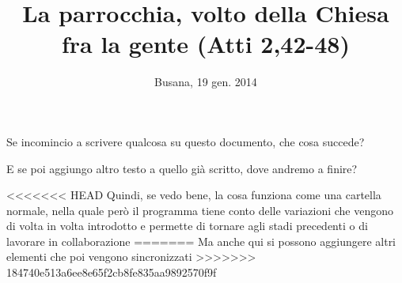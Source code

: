 \documentclass[a4paper,12pt,article,oneside]{memoir} %
\title{La parrocchia, volto della Chiesa fra la gente (Atti 2,42-48)}
\author{}
\date{Busana, 19 gen. 2014}
\begin{document}
\maketitle
\thispagestyle{empty}

Se incomincio a scrivere qualcosa su questo documento, che cosa succede?

E se poi aggiungo altro testo a quello già scritto, dove andremo a finire?

<<<<<<< HEAD
Quindi, se vedo bene, la cosa funziona come una cartella normale, nella quale però il programma tiene conto delle variazioni che vengono di volta in volta introdotto e permette di tornare agli stadi precedenti o di lavorare in collaborazione
=======
Ma anche qui si possono aggiungere altri elementi che poi vengono sincronizzati
>>>>>>> 184740e513a6ee8e65f2cb8fe835aa9892570f9f
\end{document}

